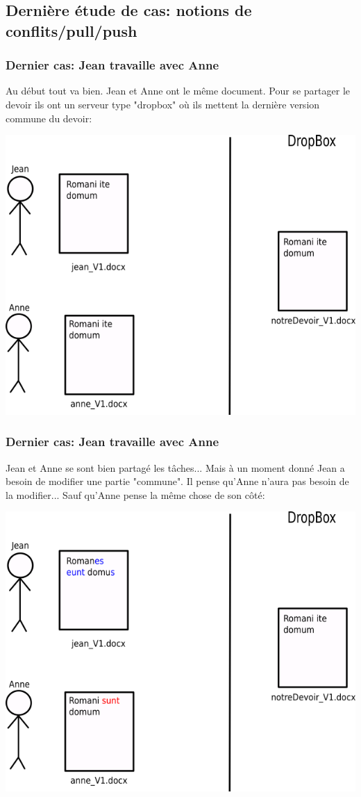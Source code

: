 \documentclass{beamer}
\begin{document}
\subsection{Dernière étude de cas: notions de conflits/pull/push}
\begin{frame}
\frametitle{Dernier cas: Jean travaille avec Anne}
Au début tout va bien. Jean et Anne ont le même document. Pour se partager le devoir ils ont un serveur type "dropbox" où ils mettent la dernière version commune du devoir:
\begin{center}
    \includegraphics[scale=0.4]{images/lastScenario/lastScenario_init.png}
\end{center}
\end{frame}

\begin{frame}
\frametitle{Dernier cas: Jean travaille avec Anne}
Jean et Anne se sont bien partagé les tâches... Mais à un moment donné Jean a besoin de modifier une partie "commune". Il pense qu'Anne n'aura pas besoin de la modifier... Sauf qu'Anne pense la même chose de son côté:
\begin{center}
    \includegraphics[scale=0.4]{images/lastScenario/lastScenario_conflict1.png}
\end{center}
\end{frame}
\end{document}
